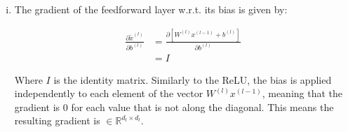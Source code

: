 \documentclass{article}
\begin{document}
\begin{enumerate}[i.]
  \item The gradient of the feedforward layer w.r.t. its bias is given by:

  \begin{align*}
    \frac{\partial \tilde{x}^{(l)}}{\partial b^{(l)}} &= \frac{\partial \left[ W^{(l)} x^{(l-1)} + b^{(l)} \right]}{\partial b^{(l)}} \\
    &= I
  \end{align*}

  Where $I$ is the identity matrix. Similarly to the ReLU, the bias is applied independently to each element of the vector $W^{(l)} x^{(l-1)}$, meaning that the gradient is $0$ for each value that is not along the diagonal. This means the resulting gradient is $\in \mathbb{R}^{d_l \times d_l}$.

\end{enumerate}

\subsubsection{}
\end{document}
